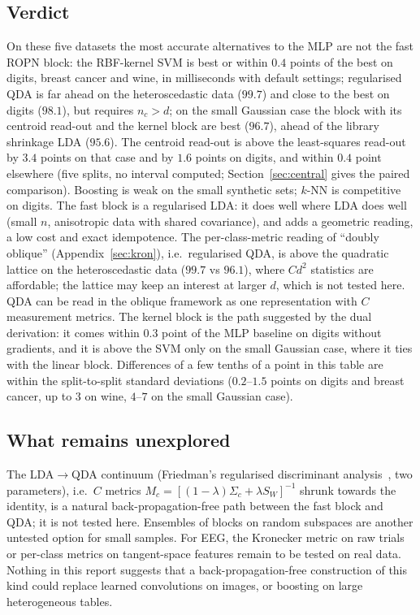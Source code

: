 \documentclass[11pt,a4paper]{article}
\theoremstyle{plain}
\theoremstyle{definition}
\theoremstyle{remark}
\begin{document}
\subsection{Verdict}
On these five datasets the most accurate alternatives to the MLP are not
the fast ROPN block: the RBF-kernel SVM is best or within $0.4$ points of
the best on digits, breast cancer and wine, in milliseconds with default
settings; regularised QDA is far ahead on the heteroscedastic data ($99.7$)
and close to the best on digits ($98.1$), but requires $n_c>d$; on the
small Gaussian case the block with its centroid read-out and the kernel
block are best ($96.7$), ahead of the library shrinkage LDA ($95.6$). The centroid read-out is
above the least-squares read-out by $3.4$ points on that case and by $1.6$
points on digits, and within $0.4$ point elsewhere (five splits, no
interval computed; Section~\ref{sec:central} gives the paired
comparison). Boosting is weak on the small synthetic
sets; $k$-NN is competitive on digits. The fast block is a regularised LDA:
it does well where LDA does well (small $n$, anisotropic data with shared
covariance), and adds a geometric reading, a low cost and exact idempotence.
The per-class-metric reading of ``doubly oblique'' (Appendix~\ref{sec:kron}),
i.e.\ regularised QDA, is above the quadratic lattice on the
heteroscedastic data ($99.7$ vs $96.1$), where $Cd^2$ statistics are
affordable; the lattice may keep an interest at larger $d$, which is not
tested here. QDA can be read in the oblique framework as one representation
with $C$ measurement metrics. The kernel block is the path suggested by the
dual derivation: it comes within $0.3$ point of the MLP baseline on digits
without gradients, and it is above the SVM only on the small Gaussian
case, where it ties with the linear block. Differences of
a few tenths of a point in this table are within the split-to-split standard
deviations ($0.2$--$1.5$ points on digits and breast cancer, up to $3$ on
wine, $4$--$7$ on the small Gaussian case).

\subsection{What remains unexplored}
The LDA$\to$QDA continuum (Friedman's regularised discriminant
analysis~\cite{friedman1989rda}, two parameters), i.e.\ $C$ metrics $M_c=[(1-\lambda)\Sigma_c+\lambda S_W]^{-1}$
shrunk towards the identity, is a natural back-propagation-free path between the
fast block and QDA; it is not tested here. Ensembles of blocks on random
subspaces are another untested option for small samples. For EEG, the
Kronecker metric on raw trials or per-class metrics on tangent-space
features remain to be tested on real data. Nothing in this report suggests
that a back-propagation-free construction of this kind could replace learned convolutions on
images, or boosting on large heterogeneous tables.
\end{document}
